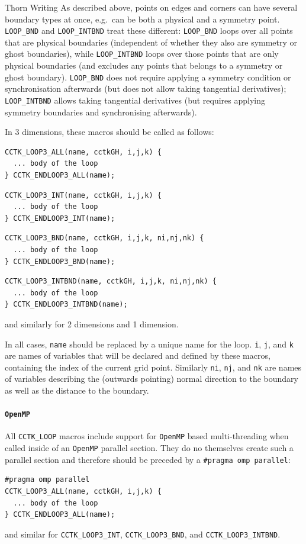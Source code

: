 \begin{cactuspart}{Thorn Writing}
As described above, points on edges and corners can have several
boundary types at once, e.g.\ can be both a physical and a symmetry
point. \texttt{LOOP\_BND} and \texttt{LOOP\_INTBND} treat these
different: \texttt{LOOP\_BND} loops over all points that are physical
boundaries (independent of whether they also are symmetry or ghost
boundaries), while \texttt{LOOP\_INTBND} loops over those points that
are only physical boundaries (and excludes any points that belongs to
a symmetry or ghost boundary). \texttt{LOOP\_BND} does not require
applying a symmetry condition or synchronisation afterwards (but does
not allow taking tangential derivatives); \texttt{LOOP\_INTBND} allows
taking tangential derivatives (but requires applying symmetry
boundaries and synchronising afterwards).

In 3 dimensions, these macros should be called as follows:
\begin{verbatim}
CCTK_LOOP3_ALL(name, cctkGH, i,j,k) {
  ... body of the loop
} CCTK_ENDLOOP3_ALL(name);
\end{verbatim}

\begin{verbatim}
CCTK_LOOP3_INT(name, cctkGH, i,j,k) {
  ... body of the loop
} CCTK_ENDLOOP3_INT(name);
\end{verbatim}

\begin{verbatim}
CCTK_LOOP3_BND(name, cctkGH, i,j,k, ni,nj,nk) {
  ... body of the loop
} CCTK_ENDLOOP3_BND(name);
\end{verbatim}

\begin{verbatim}
CCTK_LOOP3_INTBND(name, cctkGH, i,j,k, ni,nj,nk) {
  ... body of the loop
} CCTK_ENDLOOP3_INTBND(name);
\end{verbatim}
and similarly for 2 dimensions and 1 dimension.

In all cases, \texttt{name} should be replaced by a unique name for
the loop. \texttt{i}, \texttt{j}, and \texttt{k} are names of
variables that will be declared and defined by these macros,
containing the index of the current grid point. Similarly \texttt{ni},
\texttt{nj}, and \texttt{nk} are names of variables describing the
(outwards pointing) normal direction to the boundary as well as the
distance to the boundary.

\paragraph{\texttt{OpenMP}} All \texttt{CCTK\_LOOP} macros include support for
\texttt{OpenMP} based multi-threading when called inside of an \texttt{OpenMP}
parallel section. They do no themselves create such a parallel section and
therefore should be preceded by a \texttt{\#pragma omp parallel}:
\begin{verbatim}
#pragma omp parallel
CCTK_LOOP3_ALL(name, cctkGH, i,j,k) {
  ... body of the loop
} CCTK_ENDLOOP3_ALL(name);
\end{verbatim}
and similar for \texttt{CCTK\_LOOP3\_INT}, \texttt{CCTK\_LOOP3\_BND}, and
\texttt{CCTK\_LOOP3\_INTBND}.


\end{cactuspart}
